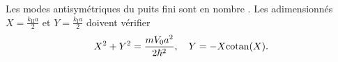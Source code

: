 \documentclass[12pt,fancy]{cours}
\begin{document}

\begin{prop}\label{prop:}
Les modes antisymétriques du puits fini sont en nombre . Les  adimensionnés $X=\frac{k_\mathrm{II}a}{2}$ et $Y=\frac{k_\mathrm{I}a}{2}$ doivent vérifier
\begin{equation*}
   X^2+Y^2=\frac{mV_0a^2}{2\hbar^2}, \quad Y=-X{\rm cotan}(X).
\end{equation*}
\end{prop}
%
%
\end{document}
